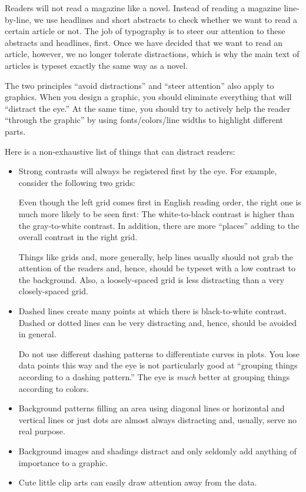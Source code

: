 Readers will not read a magazine like a novel. Instead of reading a magazine
line-by-line, we use headlines and short abstracts to check whether we want to
read a certain article or not. The job of typography is to steer our attention
to these abstracts and headlines, first. Once we have decided that we want to
read an article, however, we no longer tolerate distractions, which is why the
main text of articles is typeset exactly the same way as a novel.

The two principles ``avoid distractions'' and ``steer attention'' also apply to
graphics. When you design a graphic, you should eliminate everything that will
``distract the eye.'' At the same time, you should try to actively help the
reader ``through the graphic'' by using fonts/colors/line widths to highlight
different parts.

Here is a non-exhaustive list of things that can distract readers:
%
\begin{itemize}
    \item Strong contrasts will always be registered first by the eye. For
        example, consider the following two grids:

        \medskip\par

        \medskip
        Even though the left grid comes first in English reading order, the
        right one is much more likely to be seen first: The white-to-black
        contrast is higher than the gray-to-white contrast. In addition,
        there are more ``places'' adding to the overall contrast in the right
        grid.

        Things like grids and, more generally, help lines usually should not
        grab the attention of the readers and, hence, should be typeset with
        a low contrast to the background. Also, a loosely-spaced grid is less
        distracting than a very closely-spaced grid.
    \item Dashed lines create many points at which there is black-to-white
        contrast. Dashed or dotted lines can be very distracting and, hence,
        should be avoided in general.

        Do not use different dashing patterns to differentiate curves in
        plots. You lose data points this way and the eye is not particularly
        good at ``grouping things according to a dashing pattern.'' The eye
        is \emph{much} better at grouping things according to colors.
    \item Background patterns filling an area using  diagonal lines or
        horizontal and vertical lines or just dots are almost always
        distracting and, usually, serve no real purpose.
    \item Background images and shadings distract and only seldomly add
        anything of importance to a graphic.
    \item Cute little clip arts can easily draw attention away from the data.
\end{itemize}
